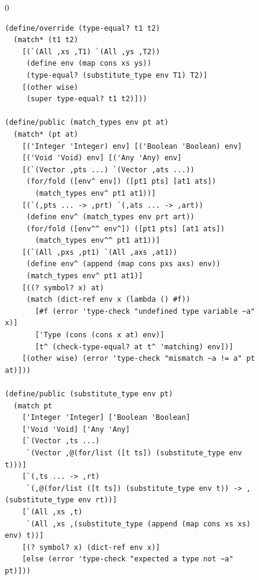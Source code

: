 \documentclass[7x10]{TimesAPriori_MIT}%
\def\racketEd{0}
\def\edition{1}
\numberwithin{theorem}{chapter}
\numberwithin{definition}{chapter}
\numberwithin{equation}{chapter}
\begin{document}
\begin{figure}[tbp]
\begin{tcolorbox}[colback=white]  
{\if\edition\racketEd    
\begin{lstlisting}[basicstyle=\ttfamily\scriptsize]
(define/override (type-equal? t1 t2)
  (match* (t1 t2)
    [(`(All ,xs ,T1) `(All ,ys ,T2))
     (define env (map cons xs ys))
     (type-equal? (substitute_type env T1) T2)]
    [(other wise)
     (super type-equal? t1 t2)]))

(define/public (match_types env pt at)
  (match* (pt at)
    [('Integer 'Integer) env] [('Boolean 'Boolean) env]
    [('Void 'Void) env] [('Any 'Any) env]
    [(`(Vector ,pts ...) `(Vector ,ats ...))
     (for/fold ([env^ env]) ([pt1 pts] [at1 ats])
       (match_types env^ pt1 at1))]
    [(`(,pts ... -> ,prt) `(,ats ... -> ,art))
     (define env^ (match_types env prt art))
     (for/fold ([env^^ env^]) ([pt1 pts] [at1 ats])
       (match_types env^^ pt1 at1))]
    [(`(All ,pxs ,pt1) `(All ,axs ,at1))
     (define env^ (append (map cons pxs axs) env))
     (match_types env^ pt1 at1)]
    [((? symbol? x) at)
     (match (dict-ref env x (lambda () #f))
       [#f (error 'type-check "undefined type variable ~a" x)]
       ['Type (cons (cons x at) env)]
       [t^ (check-type-equal? at t^ 'matching) env])]
    [(other wise) (error 'type-check "mismatch ~a != a" pt at)]))

(define/public (substitute_type env pt)
  (match pt
    ['Integer 'Integer] ['Boolean 'Boolean]
    ['Void 'Void] ['Any 'Any]
    [`(Vector ,ts ...)
     `(Vector ,@(for/list ([t ts]) (substitute_type env t)))]
    [`(,ts ... -> ,rt)
     `(,@(for/list ([t ts]) (substitute_type env t)) -> ,(substitute_type env rt))]
    [`(All ,xs ,t)
     `(All ,xs ,(substitute_type (append (map cons xs xs) env) t))]
    [(? symbol? x) (dict-ref env x)]
    [else (error 'type-check "expected a type not ~a" pt)]))


\end{lstlisting}}
\end{tcolorbox}
\end{figure}
\end{document}
